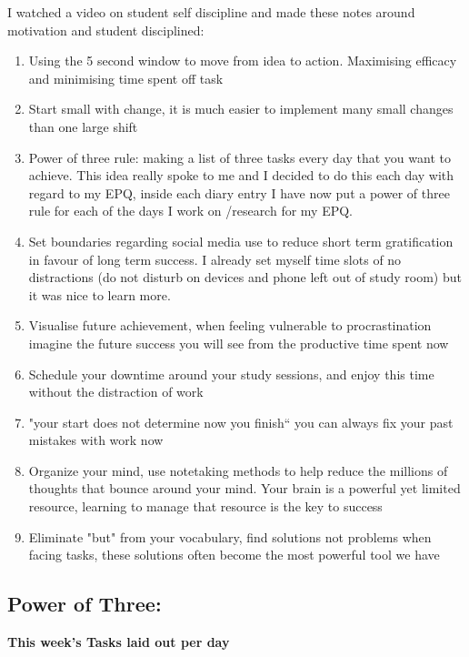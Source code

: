 I watched a video on student self discipline \cite{mikedee13WaysBe2021} and made these notes around motivation and student disciplined:
\begin{enumerate}
	\item Using the 5 second window to move from idea to action. Maximising efficacy and minimising time spent off task
	\item Start small with change, it is much easier to implement many small changes than one large shift
	\item Power of three rule: making a list of three tasks every day that you want to achieve. This idea really spoke to me and I decided to do this each day with regard to my EPQ, inside each diary entry I have now put a power of three rule for each of the days I work on /research for my EPQ. 
	\item Set boundaries regarding social media use to reduce short term gratification in favour of long term success. I already set myself time slots of no distractions (do not disturb on devices and phone left out of study room) but it was nice to learn more.
	\item Visualise future achievement, when feeling vulnerable to procrastination imagine the future success you will see from the productive time spent now
	\item Schedule your downtime around your study sessions, and enjoy this time without the distraction of work
	\item "your start does not determine now you finish“ you can always fix your past mistakes with work now
	\item Organize your mind, use notetaking methods to help reduce the millions of thoughts that bounce around your mind. Your brain is a powerful yet limited resource, learning to manage that resource is the key to success 
	\item Eliminate "but" from your vocabulary, find solutions not problems when facing tasks, these solutions often become the most powerful tool we have 
\end{enumerate}


\subsection*{Power of Three:}
\textbf{This week's Tasks laid out per day}

